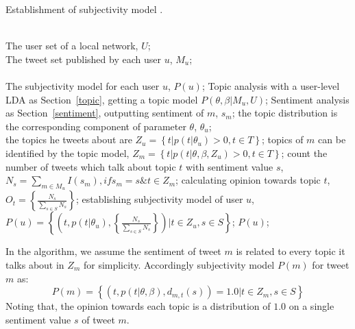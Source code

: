 \documentclass[twocolumn]{svjour3}          %
\begin{document}
\begin{algorithm}[htb] 
\caption{ Establishment of subjectivity model .} 
\label{alg1}
\begin{algorithmic}[1] %
\REQUIRE ~~\\ %
The user set of a local network, $ U $;\\
The tweet set published by each user $ u $, $ M_{u} $;\\
\ENSURE ~~\\ %
The subjectivity model for each user $ u $, $ P(u) $;
\STATE Topic analysis with a user-level LDA as Section~\ref{topic}, getting a topic model $P(\theta,\beta|M_{u},U)$; 
\label{ alg1:topic }%
\label{alg1:sentiment}
\STATE Sentiment analysis as Section~\ref{sentiment}, outputting sentiment of $ m $, $ s_{m} $;
\ENDFOR
{}
\STATE the topic distribution is the corresponding component of parameter $ \theta $, $ \theta_{u} $; \\
\STATE the topics he tweets about are $ Z_{u}= \left\lbrace t \vert p\left( t \vert \theta_{u} \right)>0, t \in T \right\rbrace $; 
\ENDFOR
{}
\STATE topics of $ m $ can be identified by the topic model, $ Z_{m} =\left\lbrace t \vert p\left( t \vert \theta, \beta, Z_{u} \right)>0, t \in T \right\rbrace $; 
\ENDFOR
{}
\STATE count the number of tweets which talk about topic $ t $ with sentiment value $ s $, $ N_{s}=\sum_{m \in M_{u}} I\left( s_{m} \right) ,  if  s_{m}=s \& t \in Z_{m} $; 
\ENDFOR
\STATE calculating opinion towards topic $ t $, $  O_{t} = \left\{ \frac{N_{s}}{\sum_{s \in S} N_{s}} \right\} $;
\ENDFOR
\STATE establishing subjectivity model of user $ u $, $ P\left( u \right)= \left\lbrace \left( t, p\left( t \vert \theta_{u} \right), \left\{ \frac{N_{s}}{\sum_{s \in S} N_{s}} \right\}  \right)  \vert t \in Z_{u}, s \in S  \right\rbrace   $;
\label{subuser}
\RETURN $P(u)$; %
\end{algorithmic}
\end{algorithm}
In the algorithm,  we assume the sentiment of tweet $ m $ is related to every topic it talks about in $ Z_{m} $ for simplicity.
Accordingly subjectivity model  $ P\left( m \right) $ for tweet $ m $ as:
\begin{equation}
\label{subtweet}
P\left( m \right)= \left\lbrace \left( t, p\left( t \vert \theta, \beta \right), d_{m,t}\left( s \right) \right)=1.0  \vert t \in Z_{m}, s \in S  \right\rbrace  
\end{equation}
Noting that, the opinion towards each topic is a distribution of $ 1.0 $ on a single sentiment value $ s $ of tweet $ m $.
\end{document}
